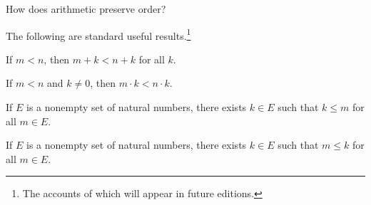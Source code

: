 

How does arithmetic preserve order?


The following are standard useful results.\footnote{The accounts of which will appear in future editions.}

\begin{proposition}
	If $m < n$, then $m + k < n + k$ for all $k$.
\end{proposition}

\begin{proposition}
	If $m < n$ and $k \neq 0$, then $m \cdot k < n \cdot k$.
\end{proposition}

\begin{proposition}
	If $E$ is a nonempty set of natural numbers, there exists $k \in E$ such that $k \leq m$ for all $m \in E$.
\end{proposition}

\begin{proposition}
	If $E$ is a nonempty set of natural numbers, there exists $k \in E$ such that $m \leq k$ for all $m \in E$.
\end{proposition}

\blankpage